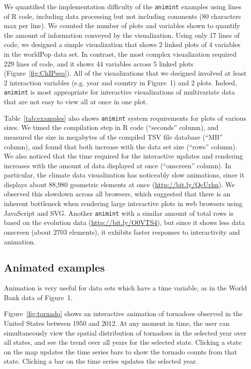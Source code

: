 \documentclass[12pt]{article}\usepackage[]{graphicx}\usepackage[]{color}
\begin{document}
We quantified the implementation difficulty of the \texttt{animint} examples
using lines of R code, including data processing but not including
comments (80 characters max per line). We counted the number of plots
and variables shown to quantify the amount of information conveyed by
the visualization. Using only 17 lines of code, we designed a simple
visualization that shows 2 linked plots of 4 variables in the worldPop
data set. In contrast, the most complex visualization required 229
lines of code, and it shows 44 variables across 5 linked plots
(Figure~\ref{fig:ChIPseq}). All of the visualizations that we designed
involved at least 2 interaction variables (e.g. year and country in
Figure~1) and 2 plots. Indeed, \texttt{animint} is most appropriate for
interactive visualizations of multivariate data that are not easy to
view all at once in one plot.

Table~\ref{tab:examples} also shows \texttt{animint} system requirements for
plots of various sizes. We timed the compilation step in R code
(``seconds'' column), and measured the size in megabytes of the
compiled TSV file database (``MB'' column), and found that both
increase with the data set size (``rows'' column).
We also noticed that the time required for the interactive updates and
rendering increases with the amount of data displayed at once
(``onscreen'' column). In particular, the climate data visualization
has noticeably slow animations, since it displays about 88,980
geometric elements at once (\url{http://bit.ly/QcUrhn}). We observed
this slowdown across all browsers, which suggested that there is an
inherent bottleneck when rendering large interactive plots in web
browsers using JavaScript and SVG. Another \texttt{animint} with a similar
amount of total rows is based on the evolution data
(\url{http://bit.ly/O0VTS4}), but since it shows less data onscreen
(about 2703 elements), it exhibits faster responses to interactivity
and animation.

\subsection{Animated examples}

Animation is very useful for data sets which have a time variable,
as in the World Bank data of Figure~1.

Figure~\ref{fig:tornado} shows an interactive animation of tornadoes
observed in the United States between 1950 and 2012. At any moment in
time, the user can simultaneously view the spatial distribution of
tornadoes in the selected year over all states, and see the trend over
all years for the selected state. Clicking a state on the map updates the
time series bars to show the tornado counts from that state. Clicking
a bar on the time series updates the selected year.
\end{document}
